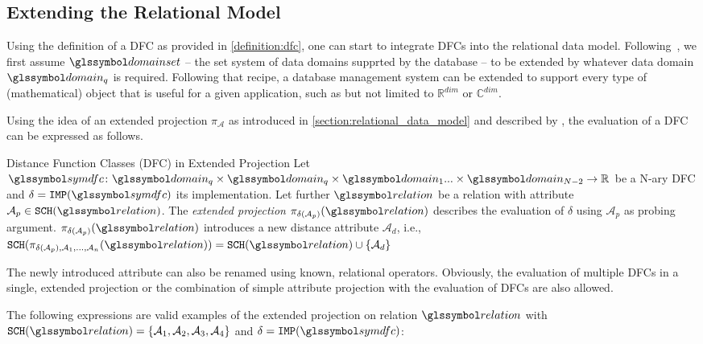 \subsection{Extending the Relational Model}

Using the definition of a DFC as provided in \cref{definition:dfc}, one can start to integrate DFCs into the relational data model. Following~\cite{Giangreco:2018thesis}, we first assume  $\domainset$ -- the set system of data domains supprted by the database -- to be extended by whatever data domain $\domain_q$ is required. Following that recipe, a database management system can be extended to support every type of (mathematical) object that is useful for a given application, such as but not limited to $\mathbb{R}^{dim}$ or $\mathbb{C}^{dim}$. 

Using the idea of an extended projection $\pi_{\mathcal{A}}$ as introduced in \cref{section:relational_data_model} and described by \cite{Garcia:2009Database}, the evaluation of a DFC can be expressed as follows.

\begin{definition}[label=definition:spf_rel]{Distance Function Classes (DFC) in Extended Projection}{}
    Let $\symdfc \colon \domain_q \times \domain_q \times \domain_{1} ... \times \domain_{N-2} \to \mathbb{R}$ be a N-ary DFC and $\delta = \mathtt{IMP}(\symdfc)$ its implementation. Let further $\relation$ be a relation with attribute $\mathcal{A}_p \in \mathtt{SCH}(\relation)$. The \emph{extended projection} $\pi_{\delta(\mathcal{A}_p)}(\relation)$ describes the evaluation of $\delta$ using $\mathcal{A}_p$ as probing argument. $\pi_{\delta(\mathcal{A}_p)}(\relation)$ introduces a new distance attribute $\mathcal{A}_d$, i.e., $\mathtt{SCH}(\pi_{\delta(\mathcal{A}_p), \mathcal{A}_1, ..., \mathcal{A}_n}(\relation)) = \mathtt{SCH}(\relation) \cup \{ \mathcal{A}_d \}$
\end{definition}

The newly introduced attribute can also be renamed using known, relational operators. Obviously, the evaluation of multiple DFCs in a single, extended projection or the combination of simple attribute projection with the evaluation of DFCs are also allowed. 

The following expressions are valid examples of the extended projection on relation $\relation$ with $\mathtt{SCH}(\relation) = \{ \mathcal{A}_1, \mathcal{A}_2, \mathcal{A}_3, \mathcal{A}_4 \}$ and $\delta = \mathtt{IMP}(\symdfc)$: 

